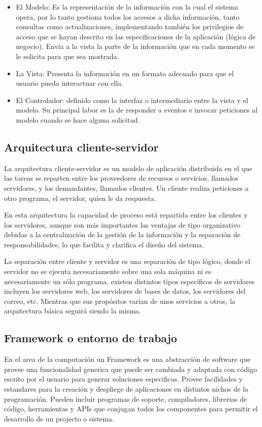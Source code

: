 \begin{itemize}

\item El Modelo: Es la representación de la información con la cual el sistema opera, por lo tanto gestiona todos los accesos a dicha información, tanto consultas como actualizaciones, implementando también los privilegios de acceso que se hayan descrito en las especificaciones de la aplicación (lógica de negocio). Envía a la vista la parte de la información que en cada momento se le solicita para que sea mostrada.

\item La Vista: Presenta la información en un formato adecuado para que el usuario pueda interactuar con ella.

\item El Controlador: definido como la interfaz o intermediario entre la vista y el modelo. Su principal labor es la de responder a eventos e invocar peticiones al modelo cuando se hace alguna solicitud. 

\end{itemize}

\subsection{Arquitectura cliente-servidor}

La arquitectura cliente-servidor es un modelo de aplicación distribuida en el que las tareas se reparten entre los proveedores de recursos o servicios, llamados servidores, y los demandantes, llamados clientes. Un cliente realiza peticiones a otro programa, el servidor, quien le da respuesta.

En esta arquitectura la capacidad de proceso está repartida entre los clientes y los servidores, aunque son más importantes las ventajas de tipo organizativo debidas a la centralización de la gestión de la información y la separación de responsabilidades, lo que facilita y clarifica el diseño del sistema.

La separación entre cliente y servidor es una separación de tipo lógico, donde el servidor no se ejecuta necesariamente sobre una sola máquina ni es necesariamente un sólo programa. existen distintos tipos específicos de servidores incluyen los servidores web, los servidores de bases de datos, los servidores del correo, etc. Mientras que sus propósitos varían de unos servicios a otros, la arquitectura básica seguirá siendo la misma.

\subsection{Framework o entorno de trabajo} 

En el area de la computación un Framework es una abstracción de software que provee una funcionalidad generica que puede ser cambiada y adaptada con código escrito por el usuario para generar soluciones especificas. Provee facilidades y estandares para la creación y despliege de aplicaciones en distintos nichos de la programación. Pueden incluir programas de soporte, compiladores, librerias de código, herramientas y APIs que conjugan todos los componentes para permitir el desarrollo de un projecto o sistema.


